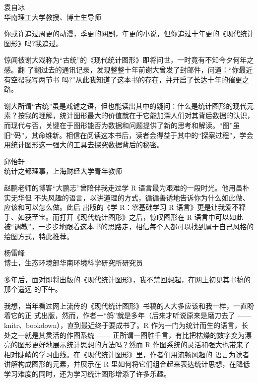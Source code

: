 \documentclass[
  b5paper,
  UTF8,twoside]{book}
\begin{document}
\begin{flushright}
袁自冰\\
华南理工大学教授、博士生导师
\end{flushright}

你或许追过周更的动漫，季更的网剧，年更的小说，但你追过十年更的《现代统计图形》吗?我追过。

惊闻被谢大戏称为``古统''的《现代统计图形》即将问世，一时竟有不知今夕何年之感。翻 了翻过去的通讯记录，发现整整十年前谢大曾发了封邮件，问道：``你最近有空帮我写两节书 吗?''从此我知道了这本书的存在，并开启了长达十年的催更之路。

谢大所谓``古统''虽是戏谑之语，但也能读出其中的疑问：什么是统计图形的现代元素？按我的理解，统计图形最大的价值就在于它能加深人们对其背后数据的认识，而现代与否，关键在于图形能否为数据和问题提供了新的思考和解读。``图''虽旧``码''，其命维新。相信在阅读这本书后，读者会得益于其中的``探案过程''，学会用统计图形这一强大的工具去探究数据背后的秘密。

\begin{flushright}
邱怡轩\\
统计之都理事，上海财经大学青年教师
\end{flushright}

赵鹏老师的博客``大鹏志''曾陪伴我走过学 R 语言最为艰难的一段时光。他用虽朴实无华但 不失风趣的语言，以讲道理的方式，循循善诱地告诉你为什么如此做、应该和可以怎么做。此后 出版的《学 R：零基础学习 R 语言》更是让我爱不释手、如获至宝。而打开《现代统计图形》之后，惊叹图形在 R 语言中可以如此被``调教''，一步步地跟着这本书的思路走，相信每个人都可以找到属于自己风格的绘图方式，特此推荐。

\begin{flushright}
杨雷峰\\
博士，生态环境部华南环境科学研究所研究员
\end{flushright}

多年后，面对即将出版的《现代统计图形》，我不禁回想起，在网上初见其书稿的那个遥远 的下午。

我想，当年看过网上流传的《现代统计图形》书稿的人大多应该和我一样，一直盼着它的正 式出版，然而，作者一``鸽''就是多年（后来才听说原来是磨刀去了 ------ knitr、bookdown），直到最近终于要成书了。R 作为一门为统计而生的语言，长处之一就是其灵活的作图系统 ------ 正所谓一图胜千言，有比把枯燥的数字变为漂亮的图形更好地展示统计思想的方法吗？然而 R 作图系统的灵活和强大也带来了相对陡峭的学习曲线。在《现代统计图形》里，作者们用流畅风趣的 语言为读者讲解构成图形的元素，并展示在 R 里如何将它们组合起来表达统计思想，在降低学习难度的同时，还为学习统计图形增添了许多乐趣。
\end{document}
